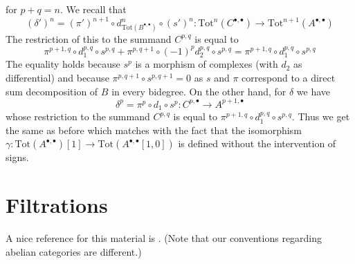 \begin{remark}
for $p + q = n$. We recall that
$$
(\delta')^n =
(\pi')^{n + 1} \circ d_{\text{Tot}(B^{\bullet, \bullet})}^n \circ (s')^n :
\text{Tot}^n(C^{\bullet, \bullet}) \to
\text{Tot}^{n + 1}(A^{\bullet, \bullet})
$$
The restriction of this to the summand $C^{p, q}$ is equal to
$$
\pi^{p + 1, q} \circ
d_1^{p, q} \circ
s^{p, q} +
\pi^{p, q + 1} \circ
(-1)^p d_2^{p, q} \circ
s^{p, q} =
\pi^{p + 1, q} \circ
d_1^{p, q} \circ
s^{p, q}
$$
The equality holds because $s^p$ is a morphism of complexes (with $d_2$
as differential) and because $\pi^{p, q + 1} \circ s^{p, q + 1} = 0$
as $s$ and $\pi$ correspond to a direct sum decomposition of $B$
in every bidegree. On the other hand, for $\delta$ we have
$$
\delta^p =  \pi^p \circ d_1 \circ s^p :
C^{p, \bullet} \to A^{p + 1, \bullet}
$$
whose restriction to the summand $C^{p, q}$ is equal to
$\pi^{p + 1, q} \circ d_1^{p, q} \circ s^{p, q}$.
Thus we get the same as before which matches with the fact that
the isomorphism
$\gamma : \text{Tot}(A^{\bullet, \bullet})[1] \to
\text{Tot}(A^{\bullet, \bullet}[1, 0])$
is defined without the intervention of signs.
\end{remark}

\section{Filtrations}
\label{homology-section-filtrations}
A nice reference for this material is \cite[Section 1]{HodgeII}.
(Note that our conventions regarding abelian categories are different.)

